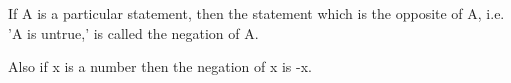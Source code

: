 If A is a particular statement, then the statement
which is the opposite of A, i.e. 'A is untrue,' is 
called the negation of A.
\par
Also if x is a number then the negation of x is -x.